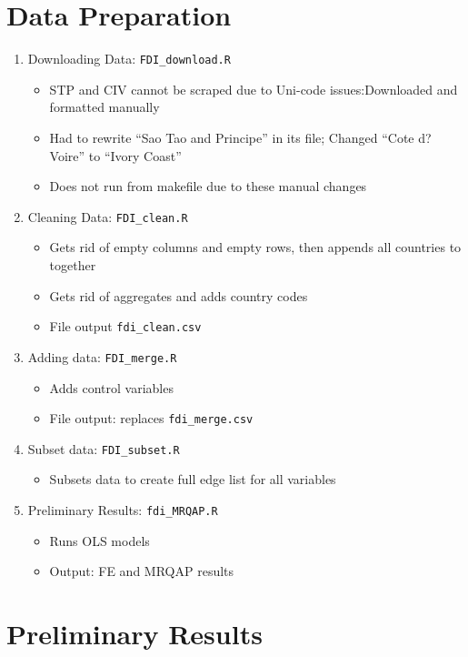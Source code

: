 \documentclass{article}
\begin{document}
\section{Data Preparation}
\begin{enumerate}
	\item Downloading Data: \texttt{FDI\_download.R}
		\begin{itemize}
			\item{STP and CIV cannot be scraped due to Uni-code issues:Downloaded and formatted manually}
			\item{Had to rewrite ``Sao Tao and Principe'' in its file; Changed ``Cote d?Voire'' to ``Ivory Coast''}
			\item{Does not run from makefile due to these manual changes}
		\end{itemize}
	\item Cleaning Data: \texttt{FDI\_clean.R}
		\begin{itemize}
			\item{Gets rid of empty columns and empty rows, then appends all countries to together}
			\item{Gets rid of aggregates and adds country codes}
			\item File output \texttt{fdi\_clean.csv}
		\end{itemize}
	\item Adding data: \texttt{FDI\_merge.R}
		\begin{itemize}
			\item{Adds control variables}
			\item File output: replaces \texttt{fdi\_merge.csv} 
		\end{itemize}
	\item Subset data: \texttt{FDI\_subset.R}
		\begin{itemize}
			\item{Subsets data to create full edge list for all variables}
		\end{itemize}
	\item Preliminary Results: \texttt{fdi\_MRQAP.R}
		\begin{itemize}
			\item{Runs OLS models}
			\item Output: FE and MRQAP results 
		\end{itemize}

		
\end{enumerate}

\section{Preliminary Results}
\end{document}
